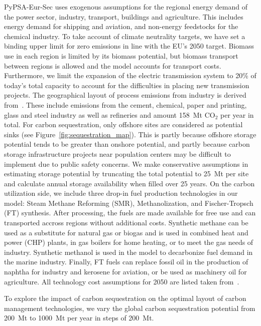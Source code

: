 \documentclass[conference]{IEEEtran}
\begin{document}
PyPSA-Eur-Sec uses exogenous assumptions for the regional energy demand of the power sector, industry, transport, buildings and agriculture. This includes energy demand for shipping and aviation, and non-energy feedstocks for the chemical industry. To take account of climate neutrality targets, we have set a binding upper limit for zero emissions in line with the EU's 2050 target. Biomass use in each region is limited by its biomass potential, but biomass transport between regions is allowed and the model accounts for transport costs. Furthermore, we limit the expansion of the electric transmission system to 20\% of today's total capacity to account for the difficulties in placing new transmission projects. The geographical layout of process emissions from industry is derived from~\cite{piamanzGeoreferencedIndustrialSites2018}. These include emissions from the cement, chemical, paper and printing, glass and steel industry as well as refineries and amount 158~Mt CO$_2$ per year in total.
For carbon sequestration, only offshore sites are considered as potential sinks (see Figure~\ref{fig:sequestration_map}). This is partly because offshore storage potential tends to be greater than onshore potential, and partly because carbon storage infrastructure projects near population centers may be difficult to implement due to public safety concerns. We make conservative assumptions in estimating storage potential by truncating the total potential to 25~Mt per site and calculate annual storage availability when filled over 25 years.
On the carbon utilization side, we include three drop-in fuel production technologies in our model: Steam Methane Reforming (SMR), Methanolization, and Fischer-Tropsch (FT) synthesis. After processing, the fuels are made available for free use and can transported accross regions without additional costs. Synthetic methane can be used as a substitute for natural gas or biogas and is used in combined heat and power (CHP) plants, in gas boilers for home heating, or to meet the gas needs of industry. Synthetic methanol is used in the model to decarbonize fuel demand in the marine industry. Finally, FT fuels can replace fossil oil in the production of naphtha for industry and kerosene for aviation, or be used as machinery oil for agriculture.
All technology cost assumptions for 2050 are listed taken from~\cite{lisazeyenPyPSATechnologydataTechnology2023}.

To explore the impact of carbon sequestration on the optimal layout of carbon management technologies, we vary the global carbon sequestration potential from 200~Mt to 1000~Mt per year in steps of 200~Mt.
\end{document}
